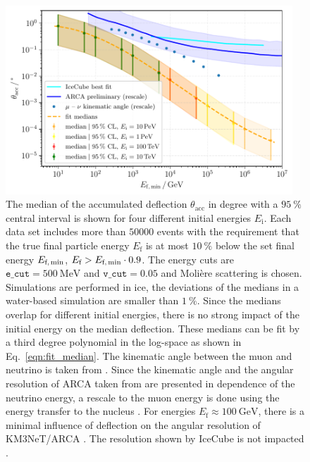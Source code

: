 \documentclass[pdflatex, sn-mathphys]{sn-jnl}%
\theoremstyle{thmstyleone}%
\theoremstyle{thmstyletwo}%
\theoremstyle{thmstylethree}%
\begin{document}
\begin{figure}
    \centering 
    \includegraphics[width=0.96\textwidth]{../../deflection/plots/FINAL/fit_median_defl_cut_10percent_only_poly_new_resolution_rescale_no_icecube_paper_final.pdf}
    \caption{The median of the accumulated deflection $\theta_{\text{acc}}$ in degree 
    with a $\SI{95}{\percent}$ 
    central interval is shown for four different initial energies $E_{\text{i}}$. 
    Each data set includes more than $\num{50000}$ events with the requirement 
    that the true final particle energy $E_{\text{f}}$ is at most 
    $\SI{10}{\percent}$ below the set final energy $E_{\text{f,\,min}}$,   
    $E_{\text{f}} > E_{\text{f,\,min}} \cdot 0.9$. The energy cuts are $\texttt{e\_cut} = \SI{500}{\mega\electronvolt}$ and $\texttt{v\_cut} = 0.05$ and 
    Molière scattering is chosen. Simulations are performed in ice, the deviations 
    of the medians in a water-based simulation are smaller than $\SI{1}{\percent}$.
    Since the medians overlap for different initial energies, there is no 
    strong impact of the initial energy on the median deflection. These 
    medians can be fit by a third degree polynomial in the log-space as 
    shown in Eq.~\eqref{eqn:fit_median}. The kinematic angle between the muon and 
    neutrino is taken from \cite{KM3NeT_Resolution2016}. Since the kinematic angle and 
    the angular resolution of ARCA taken from \cite{KM3NeT_Resolution2016, KM3NeT_Resolution2021} are 
    presented in dependence of the neutrino energy, a rescale to the muon energy is done 
    using the energy transfer to the nucleus \cite{GANDHI199681}. 
    For energies 
    $E_{\text{f}} \approx \SI{100}{\giga\electronvolt}$, there is a minimal influence of deflection on the angular resolution of 
    KM3NeT/ARCA \cite{KM3NeT_Resolution2021}. The resolution shown by IceCube is not 
    impacted \cite{IceCube_Resolution2021}.}
    \label{fig:fit_median}
\end{figure}
\end{document}
